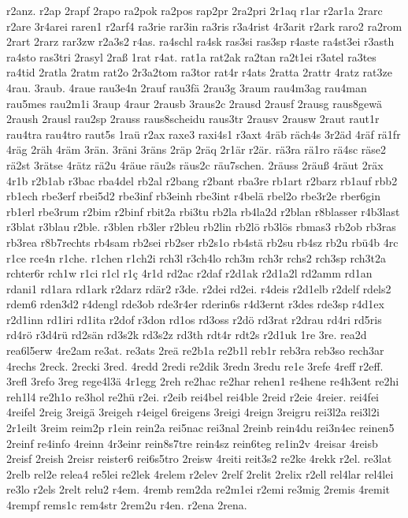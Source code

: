 {r2anz.
r2ap
2rapf
2rapo
ra2pok
ra2pos
rap2pr
2ra2pri
2r1aq
r1ar
r2ar1a
2rarc
r2are
3r4arei
raren1
r2arf4
ra3rie
rar3in
ra3ris
r3a4rist
4r3arit
r2ark
raro2
ra2rom
2rart
2rarz
rar3zw
r2a3s2
r4as.
ra4schl
ra4sk
ras3si
ras3sp
r4aste
ra4st3ei
r3asth
ra4sto
ras3tri
2rasyl
2raß
1rat
r4at.
rat1a
rat2ak
ra2tan
ra2t1ei
r3atel
ra3tes
ra4tid
2ratla
2ratm
rat2o
2r3a2tom
ra3tor
rat4r
r4ats
2ratta
2rattr
4ratz
rat3ze
4rau.
3raub.
4raue
rau3e4n
2rauf
rau3fä
2rau3g
3raum
rau4m3ag
rau4man
rau5mes
rau2m1i
3raup
4raur
2rausb
3raus2c
2rausd
2rausf
2rausg
raus8gewä
2raush
2rausl
rau2sp
2rauss
raus8scheidu
raus3tr
2rausv
2rausw
2raut
raut1r
rau4tra
rau4tro
raut5s
1raü
r2ax
raxe3
raxi4s1
r3axt
4räb
räch4s
3r2äd
4räf
rä1fr
4räg
2räh
4räm
3rän.
3räni
3räns
2räp
2räq
2r1är
r2är.
rä3ra
rä1ro
rä4sc
räse2
rä2st
3rätse
4rätz
rä2u
4räue
räu2s
räus2c
räu7schen.
2räuss
2räuß
4räut
2räx
4r1b
r2b1ab
r3bac
rba4del
rb2al
r2bang
r2bant
rba3re
rb1art
r2barz
rb1auf
rbb2
rb1ech
rbe3erf
rbei5d2
rbe3inf
rb3einh
rbe3int
r4belä
rbel2o
rbe3r2e
rber6gin
rb1erl
rbe3rum
r2bim
r2binf
rbit2a
rbi3tu
rb2la
rb4la2d
r2blan
r8blasser
r4b3last
r3blat
r3blau
r2ble.
r3blen
rb3ler
r2bleu
rb2lin
rb2lö
rb3lös
rbmas3
rb2ob
rb3ras
rb3rea
r8b7rechts
rb4sam
rb2sei
rb2ser
rb2s1o
rb4stä
rb2su
rb4sz
rb2u
rbü4b
4rc
r1ce
rce4n
r1che.
r1chen
r1ch2i
rch3l
r3ch4lo
rch3m
rch3r
rchs2
rch3sp
rch3t2a
rchter6r
rch1w
r1ci
r1cl
r1ç
4r1d
rd2ac
r2daf
r2d1ak
r2d1a2l
rd2amm
rd1an
rdani1
rd1ara
rd1ark
r2darz
rdär2
r3de.
r2dei
rd2ei.
r4deis
r2d1elb
r2delf
rdels2
rdem6
rden3d2
r4dengl
rde3ob
rde3r4er
rderin6s
r4d3ernt
r3des
rde3sp
r4d1ex
r2d1inn
rd1iri
rd1ita
r2dof
r3don
rd1os
rd3oss
r2dö
rd3rat
r2drau
rd4ri
rd5ris
rd4rö
r3d4rü
rd2sän
rd3s2k
rd3s2z
rd3th
rdt4r
rdt2s
r2d1uk
1re
3re.
rea2d
rea6l5erw
4re2am
re3at.
re3ats
2reä
re2b1a
re2b1l
reb1r
reb3ra
reb3so
rech3ar
4rechs
2reck.
2recki
3red.
4redd
2redi
re2dik
3redn
3redu
re1e
3refe
4reff
r2eff.
3refl
3refo
3reg
rege4l3ä
4r1egg
2reh
re2hac
re2har
rehen1
re4hene
re4h3ent
re2hi
reh1l4
re2h1o
re3hol
re2hü
r2ei.
r2eib
rei4bel
rei4ble
2reid
r2eie
4reier.
rei4fei
4reifel
2reig
3reigä
3reigeh
r4eigel
6reigens
3reigi
4reign
3reigru
rei3l2a
rei3l2i
2r1eilt
3reim
reim2p
r1ein
rein2a
rei5nac
rei3nal
2reinb
rein4du
rei3n4ec
reinen5
2reinf
re4info
4reinn
4r3einr
rein8s7tre
rein4sz
rein6teg
re1in2v
4reisar
4reisb
2reisf
2reish
2reisr
reister6
rei6s5tro
2reisw
4reiti
reit3s2
re2ke
4rekk
r2el.
re3lat
2relb
rel2e
relea4
re5lei
re2lek
4relem
r2elev
2relf
2relit
2relix
r2ell
rel4lar
rel4lei
re3lo
r2els
2relt
relu2
r4em.
4remb
rem2da
re2m1ei
r2emi
re3mig
2remis
4remit
4rempf
rems1c
rem4str
2rem2u
r4en.
r2ena
2rena.
}
